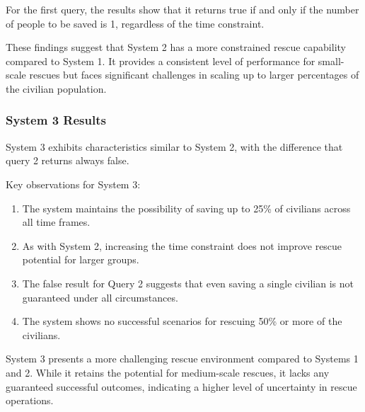 For the first query, the results show that it returns true if and only if the number of people to be saved is 1, regardless of the time constraint.

These findings suggest that System 2 has a more constrained rescue capability compared to System 1. It provides a consistent level of performance for small-scale rescues but faces significant challenges in scaling up to larger percentages of the civilian population.


\subsubsection{System 3 Results}

System 3 exhibits characteristics similar to System 2, with the difference that query 2 returns always false.

Key observations for System 3:
\begin{enumerate}
	\item The system maintains the possibility of saving up to 25\% of civilians across all time frames.
	\item As with System 2, increasing the time constraint does not improve rescue potential for larger groups.
	\item The false result for Query 2 suggests that even saving a single civilian is not guaranteed under all circumstances.
	\item The system shows no successful scenarios for rescuing 50\% or more of the civilians.
\end{enumerate}

System 3 presents a more challenging rescue environment compared to Systems 1 and 2. While it retains the potential for medium-scale rescues, it lacks any guaranteed successful outcomes, indicating a higher level of uncertainty in rescue operations.